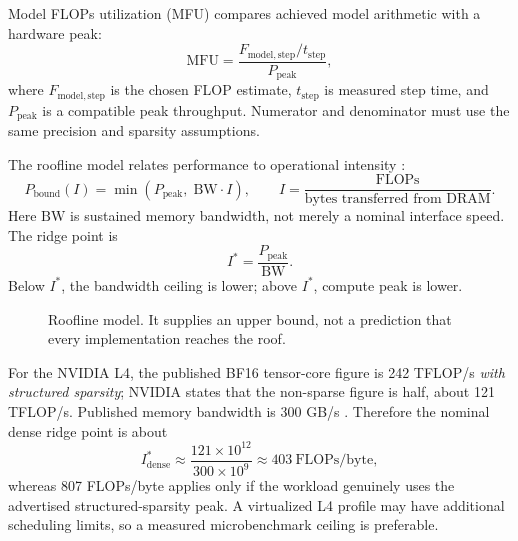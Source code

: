 \documentclass[11pt,a4paper]{article}
\theoremstyle{definition}
\theoremstyle{plain}
\begin{document}
Model FLOPs utilization (MFU) compares achieved model arithmetic with a hardware peak:
\begin{equation}\label{eq:mfu}
    \mathrm{MFU}
    =\frac{F_{\mathrm{model,step}}/t_{\mathrm{step}}}
           {P_{\mathrm{peak}}},
\end{equation}
where $F_{\mathrm{model,step}}$ is the chosen FLOP estimate, $t_{\mathrm{step}}$ is measured step time, and $P_{\mathrm{peak}}$ is a compatible peak throughput. Numerator and denominator must use the same precision and sparsity assumptions.

The roofline model relates performance to operational intensity \cite{williams2009roofline}:
\begin{equation}\label{eq:roofline}
    P_{\mathrm{bound}}(I)
    =\min(P_{\mathrm{peak}},\;\mathrm{BW}\cdot I),
    \qquad
    I=\frac{\text{FLOPs}}{\text{bytes transferred from DRAM}}.
\end{equation}
Here $\mathrm{BW}$ is sustained memory bandwidth, not merely a nominal interface speed. The ridge point is
\begin{equation}
    I^*=\frac{P_{\mathrm{peak}}}{\mathrm{BW}}.
\end{equation}
Below $I^*$, the bandwidth ceiling is lower; above $I^*$, compute peak is lower.

\begin{figure}[H]
\centering
{}
\caption{Roofline model. It supplies an upper bound, not a prediction that every implementation reaches the roof.}
\label{fig:roofline}
\end{figure}

For the NVIDIA L4, the published BF16 tensor-core figure is 242 TFLOP/s \emph{with structured sparsity}; NVIDIA states that the non-sparse figure is half, about 121 TFLOP/s. Published memory bandwidth is 300 GB/s \cite{nvidial4spec}. Therefore the nominal dense ridge point is about
\begin{equation}
    I^*_{\mathrm{dense}}
    \approx\frac{121\times10^{12}}{300\times10^9}
    \approx403\ \text{FLOPs/byte},
\end{equation}
whereas 807 FLOPs/byte applies only if the workload genuinely uses the advertised structured-sparsity peak. A virtualized L4 profile may have additional scheduling limits, so a measured microbenchmark ceiling is preferable.
\end{document}
